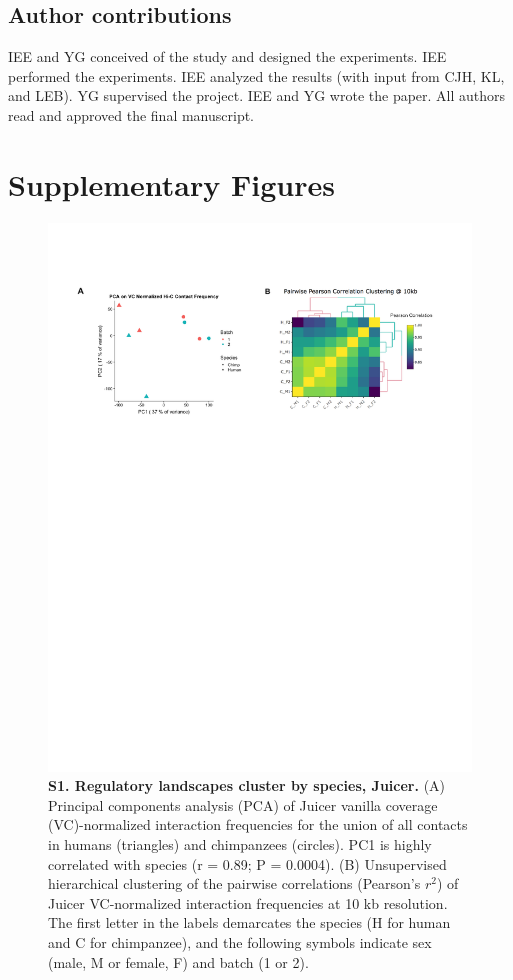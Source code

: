 \subsection{Author contributions}

IEE and YG conceived of the study and designed the experiments. IEE performed the experiments. IEE analyzed the results (with input from CJH, KL, and LEB). YG supervised the project. IEE and YG wrote the paper. All authors read and approved the final manuscript.

\pagebreak
\clearpage

\section{Supplementary Figures}\label{ch02-supplementary-figures}

\begin{figure}[!htb]
\centering
\includegraphics[width=6in]{img/figS1.pdf}
\caption[Regulatory landscapes cluster by species, Juicer.]{\textbf{S1. Regulatory landscapes cluster by species, Juicer.} (A) Principal components analysis (PCA) of Juicer vanilla coverage (VC)-normalized interaction frequencies for the union of all contacts in humans (triangles) and chimpanzees (circles). PC1 is highly correlated with species (r = 0.89; P = 0.0004). (B) Unsupervised hierarchical clustering of the pairwise correlations (Pearson's $r^2$) of Juicer VC-normalized interaction frequencies at 10 kb resolution. The first letter in the labels demarcates the species (H for human and C for chimpanzee), and the following symbols indicate sex (male, M or female, F) and batch (1 or 2).}
\label{fig:ch02-figS1}
\end{figure}

